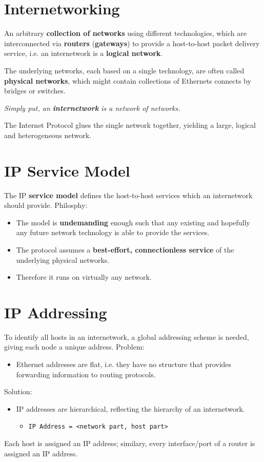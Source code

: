 \documentclass[11pt]{article}
\begin{document}
\section{Internetworking}
\label{sec:org8c2d194}
\begin{description}
\item[{Internetwork}] An arbitrary \textbf{collection of networks} using different technologies, which are interconnected via \textbf{routers} (\textbf{gateways}) to provide a host-to-host packet delivery service, i.e. an internetwork is a \textbf{logical network}.
\item The underlying networks, each based on a single technology, are often called \textbf{physical networks}, which might contain collections of Ethernets connects by bridges or switches.
\item \emph{Simply put, an \textbf{internetwork} is a network of networks.}
\item The Internet Protocol glues the single network together, yielding a large, logical and heterogeneous network.
\end{description}

\section{IP Service Model}
\label{sec:org521e7ba}
The IP \textbf{service model} defines the host-to-host services which an internetwork should provide.
Philosphy:
\begin{itemize}
\item The model is \textbf{undemanding} enough such that any existing and hopefully any future network technology is able to provide the services.
\item The protocol assumes a \textbf{best-effort, connectionless service} of the underlying physical networks.
\item Therefore it runs on virtually any network.
\end{itemize}

\section{IP Addressing}
\label{sec:orgce6f7f2}
To identify all hosts in an internetwork, a global addressing scheme is needed, giving each node a unique address.
Problem:
\begin{itemize}
\item Ethernet addresses are flat, i.e. they have no structure that provides forwarding information to routing protocols.
\end{itemize}
Solution:
\begin{itemize}
\item IP addresses are hierarchical, reflecting the hierarchy of an internetwork.
\begin{itemize}
\item \texttt{IP Address = <network part, host part>}
\end{itemize}
\end{itemize}
Each host is assigned an IP address; similary, every interface/port of a router is assigned an IP address.
\end{document}

